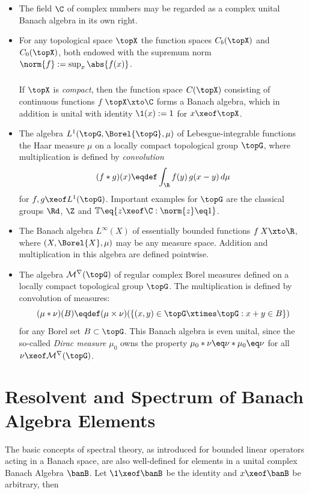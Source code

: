 \documentclass[11pt,twoside]{article}
\begin{document}
\begin{itemize}[leftmargin=12pt,itemsep=4pt]
\item[1.]
The field $\C$ of complex numbers may be regarded
as a complex unital Banach algebra in its own right.

\item[2.]
For any topological space $\topX$
the function spaces $C_b(\topX)$ and $C_0(\topX)$,
both endowed with the supremum norm $\norm{f} := \sup_{x} \abs{f(x)} $.

\subparagraph{}
If $\topX$ is \textit{compact},
then the function space $C(\topX)$ consisting of continuous functions
$f\: \topX \xto \C$ forms a Banach algebra,
which in addition is unital with identity $\1(x) := 1$ for $x \xeof \topX$.

\item[3.]
The algebra $L^1(\topG,\Borel{\topG},\mu)$ of Lebesgue-integrable functions
{\wrt} the Haar measure $\mu$ on a locally compact topological group $\topG$,
where multiplication is defined by \textit{convolution}
\[
(f \ast g)(x) \eqdef \int_{\R} f(y) \, g(x-y) \, d\mu
\]
for $f,g \xeof L^1(\topG)$.
Important examples for $\topG$ are the classical groups $\Rd$, $\Z$
and $\mathbb{T} \eq \{z \xeof \C: \norm{z} \eq 1\}$.

\item[4.]
The Banach algebra $L^{\infty}(X)$ of essentially bounded functions
$f \: X \xto \R$, 
where $(X,\Borel{X},\mu)$ may be any measure space.
Addition and multiplication in this algebra are defined pointwise.

\item[5.]
The algebra $\cal{M}^r(\topG)$ of regular complex Borel measures
defined on a locally compact topological group $\topG$.
The multiplication is defined by convolution of measures:
\[
(\mu \ast \nu)(B) \eqdef
(\mu \times \nu) (\{(x,y) \in \topG \xtimes \topG:x+y \in B\})
\]
for any Borel set $B \subset \topG$.
This Banach algebra is even unital, 
since the so-called \textit{Dirac measure} $\mu_0$ owns the property
$\mu_0 \ast \nu \eq \nu \ast \mu_0 \eq \nu$
for all $\nu \xeof \cal{M}^r(\topG)$.
\end{itemize}

\section{Resolvent and Spectrum of Banach Algebra Elements}
The basic concepts of spectral theory,
as introduced for bounded linear operators acting in a Banach space,
are also well-defined for elements in a unital complex Banach Algebra $\banB$.
Let $\1 \xeof \banB$ be the identity and $x \xeof \banB$ be arbitrary,
then
\end{document}
